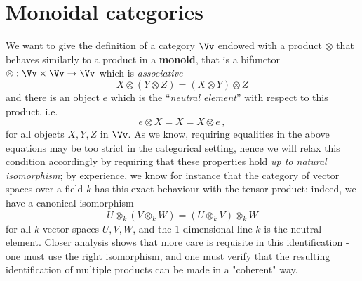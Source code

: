 
\section{Monoidal categories}



We want to give the definition of a category $\Vv$ 
endowed with a product $\otimes$ that behaves similarly
to a product in a \textbf{monoid}, that is a bifunctor 
$\otimes : \Vv \times \Vv \to \Vv$ which is \emph{associative}
\begin{equation*}
    X \otimes ( Y \otimes Z) = (X \otimes Y) \otimes Z
\end{equation*}
and there is an object $e$ which is the ``\emph{neutral element}''
with respect to this product, i.e.
\begin{equation*}
    e \otimes X = X = X \otimes e\,,
\end{equation*}
for all objects $X,Y,Z$ in $\Vv$.
As we know, requiring equalities in the above equations
may be too strict in the categorical setting,
hence we will relax this condition accordingly
by requiring that these properties hold \emph{up to natural isomorphism};
by experience, we know for instance that the category of vector spaces
over a field $k$ has this exact behaviour with the tensor product:
indeed, we have a canonical isomorphism
\begin{equation*}
    U \otimes_{k} ( V \otimes_{k} W) = (U \otimes_{k} V) \otimes_{k} W
\end{equation*}
for all $k$-vector spaces $U,V,W$, and the $1$-dimensional line
$k$ is the neutral element. 
Closer analysis shows that more care is requisite in this identification 
- one must use the right isomorphism, 
and one must verify that the resulting identification of multiple 
products can be made in a "coherent" way.

